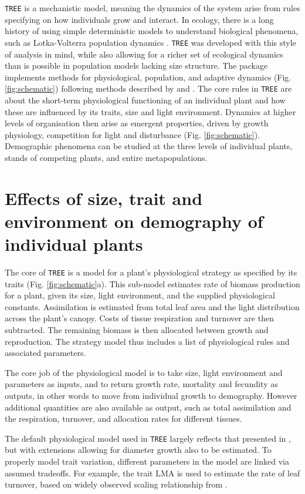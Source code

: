 \documentclass[a4paper,11pt]{article}
\begin{document}
\texttt{TREE} is a mechanistic model, meaning the dynamics of the system arise
from rules specifying on how individuals grow and interact. In ecology,
there is a long history of using simple deterministic models
to understand biological phenomena, such as Lotka-Volterra population dynamics
\citep{MacArthur-1967, Leimar-2013} .
\texttt{TREE} was developed with this style of analysis in mind, while also
allowing for a richer set of ecological dynamics than is possible in
population models lacking size structure. The package implements methods
for physiological, population, and adaptive dynamics (Fig.
\ref{fig:schematic}) following methods described by \citet{Falster-2011}
and \citet{Falster-2015}. The core rules in \texttt{TREE} are about the
short-term physiological functioning of an individual plant and how
these are influenced by its traits, size and light environment. Dynamics
at higher levels of organisation then arise as emergent properties,
driven by growth physiology, competition for light and disturbance (Fig.
\ref{fig:schematic}). Demographic phenomena can be studied at the three
levels of individual plants, stands of competing plants, and entire
metapopulations.

\section{Effects of size, trait and environment on demography of individual plants}

The core of \texttt{TREE} is a model for a plant's physiological strategy as
specified by its traits (Fig. \ref{fig:schematic}a). This sub-model
estimates rate of biomass production for a plant, given its size, light
environment, and the supplied physiological constants. Assimilation is
estimated from total leaf area and the light distribution across the
plant's canopy. Costs of tissue respiration and turnover are then
subtracted. The remaining biomass is then allocated between growth and
reproduction. The strategy model thus includes a list of physiological
rules and associated parameters.

The core job of the physiological model is to take size, light
environment and parameters as inputs, and to return growth rate,
mortality and fecundity as outputs, in other words to move from
individual growth to demography. However additional quantities are also
available as output, such as total assimilation and the respiration,
turnover, and allocation rates for different tissues.

The default physiological model used in \texttt{TREE} largely reflects that
presented in \citet{Falster-2011}, but with extensions allowing for diameter
growth also to be estimated. To properly model trait variation,
different parameters in the model are linked via assumed tradeoffs. For
example, the trait LMA is used to estimate the rate of leaf turnover,
based on widely observed scaling relationship from \citet{Wright-2004}.
\end{document}
